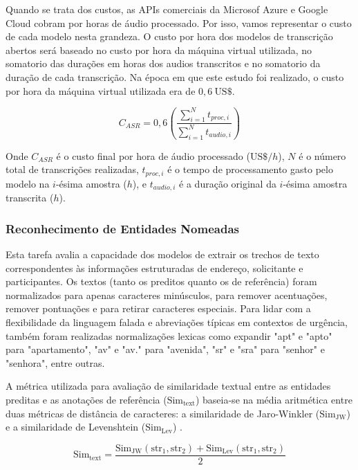 \documentclass{IEEEphot}
\begin{document}
Quando se trata dos custos, as APIs comerciais da Microsof Azure e Google Cloud cobram por horas de áudio processado. Por isso, vamos representar o custo de cada modelo nesta grandeza. O custo por hora dos modelos de transcrição abertos será baseado no custo por hora da máquina virtual utilizada, no somatorio das durações em horas dos audios transcritos e no somatorio da duração de cada transcrição. Na época em que este estudo foi realizado, o custo por hora da máquina virtual utilizada era de $0,6 \ \text{US\$}$.

\begin{equation}
    C_{ASR} = 0,6 \left( \frac{\sum_{i=1}^{N} t_{proc, i}}{\sum_{i=1}^{N} t_{audio, i}} \right)
\end{equation}

Onde $C_{ASR}$ é o custo final por hora de áudio processado ($\text{US\$}/h$), $N$ é o número total de transcrições realizadas, $t_{proc, i}$ é o tempo de processamento gasto pelo modelo na $i$-ésima amostra ($h$), e $t_{audio, i}$ é a duração original da $i$-ésima amostra transcrita ($h$).

\subsubsection{Reconhecimento de Entidades Nomeadas}

Esta tarefa avalia a capacidade dos modelos de extrair os trechos de texto correspondentes às informações estruturadas de endereço, solicitante e participantes. Os textos (tanto os preditos quanto os de referência) foram normalizados para apenas caracteres minúsculos, para remover acentuações, remover pontuações e para retirar caracteres especiais. Para lidar com a flexibilidade da linguagem falada e abreviações típicas em contextos de urgência, também foram realizadas normalizações lexicas como expandir "apt" e "apto" para "apartamento", "av" e "av." para "avenida", "sr" e "sra" para "senhor" e "senhora", entre outras. 

A métrica utilizada para avaliação de similaridade textual entre as entidades preditas e as anotações de referência ($\text{Sim}_{\text{text}}$) baseia-se na média aritmética entre duas métricas de distância de caracteres: a similaridade de Jaro-Winkler ($\text{Sim}_{\text{JW}}$) \cite{winkler1990string} e a similaridade de Levenshtein ($\text{Sim}_{\text{Lev}}$) \cite{nlp_jurafsky}. 

\begin{equation}
\text{Sim}_{\text{text}} = \frac{\text{Sim}_{\text{JW}}(\text{str}_1, \text{str}_2) + \text{Sim}_{\text{Lev}}(\text{str}_1, \text{str}_2)}{2}
\end{equation}
\end{document}

